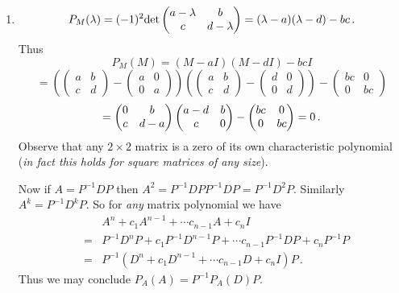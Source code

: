 \begin{enumerate}
\item 
\[
P_M(\lambda) = (-1)^2 {\rm det}\begin{pmatrix} a-\lambda & \mc b  \\ \mc c &d-\lambda\end{pmatrix}
=(\lambda-a)(\lambda-d) - bc\, . 
\]
Thus
\[
P_M(M)=(M-a I )(M- d I) - bc I \] \[= 
\left(\begin{pmatrix}a&b\\c&d\end{pmatrix}-\begin{pmatrix}a&0\\0&a\end{pmatrix}\right)
\left(\begin{pmatrix}a&b\\c&d\end{pmatrix}-\begin{pmatrix}d&0\\0&d\end{pmatrix}\right)-\begin{pmatrix}bc&0\\0&bc\end{pmatrix}
\]
\[
=\begin{pmatrix}0&\mc b\\c&d-a\end{pmatrix}\begin{pmatrix}a-d&b\\\mc c&0\end{pmatrix}-\begin{pmatrix}bc&0\\0&bc\end{pmatrix}=0\, .
\]
Observe that any $2\times 2$ matrix is a zero of its own characteristic polynomial ({\it in fact this holds for square matrices of any size}).

Now if $A=P^{-1}DP$ then $A^2=P^{-1}DPP^{-1}DP=P^{-1}D^2P$. Similarly $A^k=P^{-1} D^k P$. So for {\it any} matrix polynomial we have
\begin{eqnarray}
&& A^n + c_1 A^{n-1} + \cdots c_{n-1} A + c_n I \nonumber \\ &=& P^{-1}D^nP + c_1 P^{-1}D^{n-1}P + \cdots c_{n-1} P^{-1}DP + c_n P^{-1}P \nonumber \\ &=&
P^{-1}( D^n + c_1 D^{n-1} + \cdots c_{n-1} D + c_n I)P\, .\nonumber
\end{eqnarray}
Thus we may conclude $P_A(A)=P^{-1} P_A(D) P$. 


\end{enumerate}
